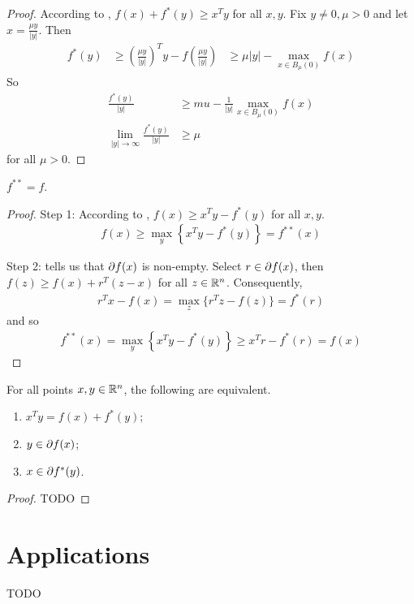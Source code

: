 \begin{proof}
According to , $f(x) + f^{*}(y) \ge x^T y $ for all $x, y$. 
Fix $y \neq 0, \mu > 0$ and let $x = \frac{\mu y}{|y|}$.
Then
\begin{align}
f^{*}(y) 
&\ge \left( \frac{\mu y}{|y|} \right)^T y - f(\frac{\mu y}{|y|}) 
&\ge \mu |y| - \max_{x \in B_{\mu}(0)} f(x)
\end{align}
So
\begin{align}
\frac{f^{*}(y)}{|y|} &\ge mu - \frac{1}{|y|} \max_{x \in B_{\mu}(0)} f(x) \\
\lim _{|y| \to \infty} \frac{f^{*}(y)}{|y|} &\ge \mu
\end{align}
for all $\mu > 0$.
\end{proof}

\begin{theorem}
$f^{**} = f$.
\end{theorem}

\begin{proof}
Step 1:
According to , $f(x) \ge x^T y - f^{*}(y)$ for all $x, y$.
\begin{align}
f(x) \ge \max_{y} \left\{ x^T y - f^{*}(y) \right\} = f^{**}(x)
\end{align}

Step 2:
 tells us that $\partial f(x)$ is non-empty.
Select $r \in \partial f(x)$, then $f(z) \ge f(x) + r^T (z- x)$ for all $z \in \mathbb{R}^n$.
Consequently, 
\begin{align}
r^T x - f(x) = \max_{z} \{ r^T z - f(z) \} = f^*(r)
\end{align}
and so
\begin{align}
f^{**}(x) = \max_{y} \left\{ x^T y - f^{*}(y) \right\} \ge x^T r - f^{*}(r) = f(x)
\end{align}
\end{proof}

\begin{theorem}
For all points $x, y \in \mathbb{R}^n$, the following are equivalent.
\begin{enumerate}
    \item $x^T y = f(x) + f^{*}(y)$;
    \item $y \in \partial f(x)$;
    \item $x \in \partial f^{*}(y)$.
\end{enumerate}
\end{theorem}

\begin{proof}
TODO
\end{proof}

\section{Applications}
TODO